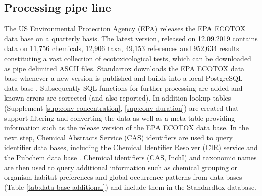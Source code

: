 \subsection*{Processing pipe line}
The US Environmental Protection Agency (EPA) releases the EPA ECOTOX data base on a quarterly basis. The latest version, released on 12.09.2019 contains data on 11,756 chemicals, 12,906 taxa, 49,153 references and 952,634 results \citep{usepa_ecotox_2019} constituting a vast collection of ecotoxicological tests, which can be downloaded as pipe delimited ASCII files. Standartox downloads the EPA ECOTOX data base whenever a new version is published and builds into a local PostgreSQL data base \citep{szocs_build_2019}. Subsequently SQL functions for further processing are added and known errors are corrected (and also reported). In addition lookup tables (Supplement \ref{sup:conv-concentration}, \ref{sup:conv-duration}) are created that support filtering and converting the data as well as a meta table providing information such as the release version of the EPA ECOTOX data base. In the next step, Chemical Abstracts Service (CAS) identifiers are used to query identifier data bases, including the Chemical Identifier Resolver (CIR) service \citep{nationalinstitutesofhealthnih_chemical_2019} and the Pubchem data base \citep{kim_pubchem_2016}. Chemical identifiers (CAS, InchI) and taxonomic names are then used to query additional information such as chemical grouping or organism habitat preferences and global occurrence patterns from data bases (Table \ref{tab:data-base-additional}) and include them in the Standardtox database.



